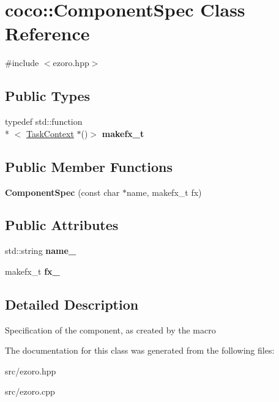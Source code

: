 \hypertarget{classcoco_1_1_component_spec}{\section{coco\-:\-:Component\-Spec Class Reference}
\label{classcoco_1_1_component_spec}
}


{\ttfamily \#include $<$ezoro.\-hpp$>$}

\subsection*{Public Types}
\begin{DoxyCompactItemize}
\item 
\hypertarget{classcoco_1_1_component_spec_a3f8ee2e4603484b700fef040758a64e9}{typedef std\-::function\\*
$<$ \hyperlink{classcoco_1_1_task_context}{Task\-Context} $\ast$()$>$ {\bfseries makefx\-\_\-t}}\label{classcoco_1_1_component_spec_a3f8ee2e4603484b700fef040758a64e9}

\end{DoxyCompactItemize}
\subsection*{Public Member Functions}
\begin{DoxyCompactItemize}
\item 
\hypertarget{classcoco_1_1_component_spec_a16fd8c7304289d6b37ae0911c6394701}{{\bfseries Component\-Spec} (const char $\ast$name, makefx\-\_\-t fx)}\label{classcoco_1_1_component_spec_a16fd8c7304289d6b37ae0911c6394701}

\end{DoxyCompactItemize}
\subsection*{Public Attributes}
\begin{DoxyCompactItemize}
\item 
\hypertarget{classcoco_1_1_component_spec_a47822521036decc06ea24b6d238980d0}{std\-::string {\bfseries name\-\_\-}}\label{classcoco_1_1_component_spec_a47822521036decc06ea24b6d238980d0}

\item 
\hypertarget{classcoco_1_1_component_spec_ab8f5984058f581717ab0cefc8316094c}{makefx\-\_\-t {\bfseries fx\-\_\-}}\label{classcoco_1_1_component_spec_ab8f5984058f581717ab0cefc8316094c}

\end{DoxyCompactItemize}


\subsection{Detailed Description}
Specification of the component, as created by the macro 

The documentation for this class was generated from the following files\-:\begin{DoxyCompactItemize}
\item 
src/ezoro.\-hpp\item 
src/ezoro.\-cpp\end{DoxyCompactItemize}
